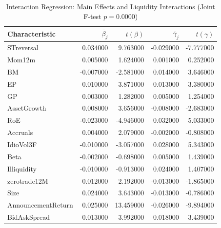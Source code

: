 \begin{table}
\caption{Interaction Regression: Main Effects and Liquidity Interactions (Joint F-test $p = 0.0000$)}
\label{tab:interaction_regression}
\begin{tabular}{lrrrr}
\toprule
Characteristic & $\bar{\beta}_j$ & $t(\beta)$ & $\bar{\gamma}_j$ & $t(\gamma)$ \\
\midrule
STreversal & 0.034000 & 9.763000 & -0.029000 & -7.777000 \\
Mom12m & 0.005000 & 1.624000 & 0.001000 & 0.252000 \\
BM & -0.007000 & -2.581000 & 0.014000 & 3.646000 \\
EP & 0.010000 & 3.871000 & -0.013000 & -3.380000 \\
GP & 0.003000 & 1.282000 & 0.005000 & 1.254000 \\
AssetGrowth & 0.008000 & 3.656000 & -0.008000 & -2.683000 \\
RoE & -0.023000 & -4.946000 & 0.032000 & 5.033000 \\
Accruals & 0.004000 & 2.079000 & -0.002000 & -0.808000 \\
IdioVol3F & -0.010000 & -3.057000 & 0.028000 & 5.343000 \\
Beta & -0.002000 & -0.698000 & 0.005000 & 1.439000 \\
Illiquidity & -0.010000 & -0.913000 & 0.024000 & 1.407000 \\
zerotrade12M & 0.012000 & 2.192000 & -0.013000 & -1.865000 \\
Size & 0.024000 & 3.643000 & -0.013000 & -0.786000 \\
AnnouncementReturn & 0.025000 & 13.459000 & -0.026000 & -9.894000 \\
BidAskSpread & -0.013000 & -3.992000 & 0.018000 & 3.439000 \\
\bottomrule
\end{tabular}
\end{table}
